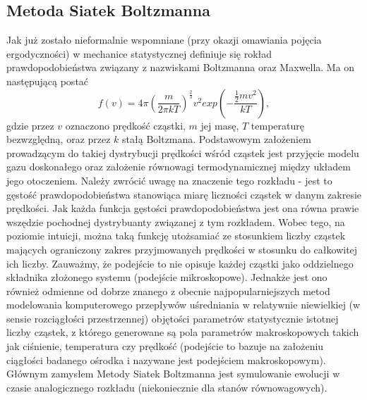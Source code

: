 \documentclass[12pt, twoside]{book}
\begin{document}
\subsection{Metoda Siatek Boltzmanna}
Jak już zostało nieformalnie wspomniane (przy okazji omawiania pojęcia ergodyczności) w mechanice statystycznej definiuje się rokład prawdopodobieństwa związany z nazwiskami Boltzmanna oraz Maxwella. Ma on następującą postać 
\begin{equation}
f(v) = 4\pi(\frac{m}{2\pi kT})^{\frac{2}{3}}v^{2}exp(-\frac{\frac{1}{2}mv^{2}}{kT}),
\end{equation}
gdzie przez $ v $ oznaczono prędkość cząstki, $ m $ jej masę, $ T $ temperaturę bezwzględną, oraz przez $ k $ stałą Boltzmana.
Podstawowym założeniem prowadzącym do takiej dystrybucji prędkości wśród cząstek jest przyjęcie modelu gazu doskonałego oraz założenie równowagi termodynamicznej między układem jego otoczeniem. Należy zwrócić uwagę na znaczenie tego rozkładu - jest to gęstość prawdopodobieństwa stanowiąca miarę liczności cząstek w danym zakresie prędkości. Jak każda funkcja gęstości prawdopodobieństwa jest ona równa prawie wszędzie pochodnej dystrybuanty związanej z tym rozkładem. Wobec tego, na poziomie intuicji, można taką funkcję utożsamiać ze stosunkiem liczby cząstek mających ograniczony zakres przyjmowanych prędkości w stosunku do całkowitej ich liczby. Zauważmy, że podejście to nie opisuje każdej cząstki jako oddzielnego składnika złożonego systemu (podejście mikroskopowe). Jednakże jest ono również odmienne od dobrze znanego z obecnie najpopularniejszych metod modelowania komputerowego przepływów uśredniania w relatywnie niewielkiej (w sensie rozciągłości przestrzennej) objętości parametrów statystycznie istotnej liczby cząstek, z którego generowane są pola parametrów makroskopowych takich jak ciśnienie, temperatura czy prędkość (podejście to bazuje na założeniu ciągłości badanego ośrodka i nazywane jest podejściem makroskopowym). Głównym zamysłem Metody Siatek Boltzmanna jest symulowanie ewolucji w czasie analogicznego rozkładu (niekoniecznie dla stanów równowagowych).
\end{document}
